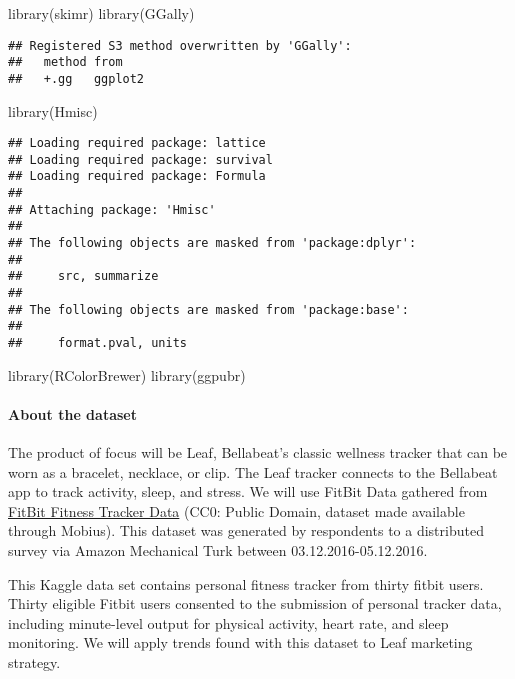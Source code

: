 \documentclass[
]{article}
\newenvironment{Shaded}{\begin{snugshade}}{\end{snugshade}}
\newcommand{\FunctionTok}[1]{\textcolor[rgb]{0.00,0.00,0.00}{#1}}
\newcommand{\NormalTok}[1]{#1}
\begin{document}
\begin{Shaded}
\begin{Highlighting}[]
\FunctionTok{library}\NormalTok{(skimr)}
\FunctionTok{library}\NormalTok{(GGally)}
\end{Highlighting}
\end{Shaded}

\begin{verbatim}
## Registered S3 method overwritten by 'GGally':
##   method from   
##   +.gg   ggplot2
\end{verbatim}

\begin{Shaded}
\begin{Highlighting}[]
\FunctionTok{library}\NormalTok{(Hmisc)}
\end{Highlighting}
\end{Shaded}

\begin{verbatim}
## Loading required package: lattice
## Loading required package: survival
## Loading required package: Formula
## 
## Attaching package: 'Hmisc'
## 
## The following objects are masked from 'package:dplyr':
## 
##     src, summarize
## 
## The following objects are masked from 'package:base':
## 
##     format.pval, units
\end{verbatim}

\begin{Shaded}
\begin{Highlighting}[]
\FunctionTok{library}\NormalTok{(RColorBrewer)}
\FunctionTok{library}\NormalTok{(ggpubr)}
\end{Highlighting}
\end{Shaded}

\hypertarget{about-the-dataset}{%
\paragraph{About the dataset}\label{about-the-dataset}}

The product of focus will be Leaf, Bellabeat's classic wellness tracker
that can be worn as a bracelet, necklace, or clip. The Leaf tracker
connects to the Bellabeat app to track activity, sleep, and stress. We
will use FitBit Data gathered from
\href{https://www.kaggle.com/datasets/arashnic/fitbit}{FitBit Fitness
Tracker Data} (CC0: Public Domain, dataset made available through
Mobius). This dataset was generated by respondents to a distributed
survey via Amazon Mechanical Turk between 03.12.2016-05.12.2016.

This Kaggle data set contains personal fitness tracker from thirty
fitbit users. Thirty eligible Fitbit users consented to the submission
of personal tracker data, including minute-level output for physical
activity, heart rate, and sleep monitoring. We will apply trends found
with this dataset to Leaf marketing strategy.
\end{document}
